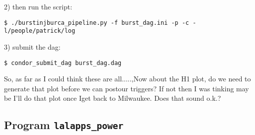 \begin{enumerate}
\begin{enumerate}
2) then run the
script: 
\begin{verbatim}
$ ./burstinjburca_pipeline.py -f burst_dag.ini -p -c -l/people/patrick/log    
\end{verbatim}

3) submit the dag:
\begin{verbatim}
$ condor_submit_dag burst_dag.dag
\end{verbatim}
So, as far as I could think these are all.....,Now about
the H1 plot, do we need to generate that plot before we can postour
triggers? If not then I was tinking may be I'll do that plot once Iget
back to Milwaukee. Does that sound o.k.? 
\end{enumerate}
\end{enumerate}

\clearpage
\subsection{Program \texttt{lalapps\_power}}
\label{program:lalapps-power}

